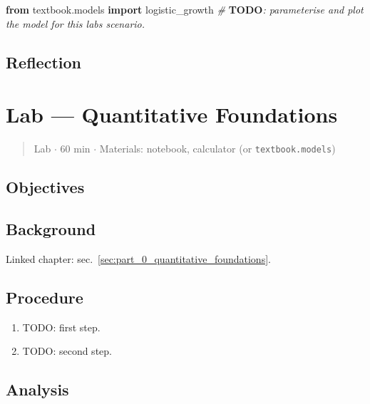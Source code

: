 \documentclass[
]{article}
\newenvironment{Shaded}{}{}
\newcommand{\AlertTok}[1]{\textcolor[rgb]{1.00,0.00,0.00}{\textbf{#1}}}
\newcommand{\CommentTok}[1]{\textcolor[rgb]{0.38,0.63,0.69}{\textit{#1}}}
\newcommand{\ImportTok}[1]{\textcolor[rgb]{0.00,0.50,0.00}{\textbf{#1}}}
\newcommand{\NormalTok}[1]{#1}
\theoremstyle{plain}
\theoremstyle{definition}
\begin{document}
\begin{Shaded}
\begin{Highlighting}[]
\ImportTok{from}\NormalTok{ textbook.models }\ImportTok{import}\NormalTok{ logistic\_growth}
\CommentTok{\# }\AlertTok{TODO}\CommentTok{: parameterise and plot the model for this lab\textquotesingle{}s scenario.}
\end{Highlighting}
\end{Shaded}

\subsection{Reflection}\label{reflection-1}

\newpage

\section{Lab --- Quantitative
Foundations}\label{sec:lab_part_0_quantitative_foundations}

\begin{quote}
Lab \texorpdfstring{\ensuremath{\cdot}}{.} 60 min \texorpdfstring{\ensuremath{\cdot}}{.} Materials: notebook, calculator (or
\texttt{textbook.models})
\end{quote}

\subsection{Objectives}\label{objectives-2}

\subsection{Background}\label{background-2}

Linked chapter: sec.~\ref{sec:part_0_quantitative_foundations}.

\subsection{Procedure}\label{procedure-2}

\begin{enumerate}
\def\labelenumi{\arabic{enumi}.}
\item
  TODO: first step.
\item
  TODO: second step.
\end{enumerate}

\subsection{Analysis}\label{analysis-2}
\end{document}
